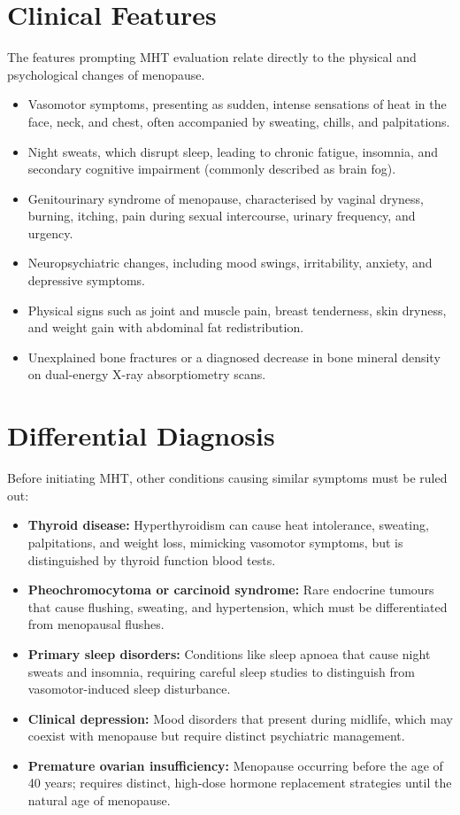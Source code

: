\section*{Clinical Features}
The features prompting MHT evaluation relate directly to the physical and psychological changes of menopause.
\begin{itemize}
    \item Vasomotor symptoms, presenting as sudden, intense sensations of heat in the face, neck, and chest, often accompanied by sweating, chills, and palpitations.
    \item Night sweats, which disrupt sleep, leading to chronic fatigue, insomnia, and secondary cognitive impairment (commonly described as brain fog).
    \item Genitourinary syndrome of menopause, characterised by vaginal dryness, burning, itching, pain during sexual intercourse, urinary frequency, and urgency.
    \item Neuropsychiatric changes, including mood swings, irritability, anxiety, and depressive symptoms.
    \item Physical signs such as joint and muscle pain, breast tenderness, skin dryness, and weight gain with abdominal fat redistribution.
    \item Unexplained bone fractures or a diagnosed decrease in bone mineral density on dual-energy X-ray absorptiometry scans.
\end{itemize}

\section*{Differential Diagnosis}
Before initiating MHT, other conditions causing similar symptoms must be ruled out:
\begin{itemize}
    \item \textbf{Thyroid disease:} Hyperthyroidism can cause heat intolerance, sweating, palpitations, and weight loss, mimicking vasomotor symptoms, but is distinguished by thyroid function blood tests.
    \item \textbf{Pheochromocytoma or carcinoid syndrome:} Rare endocrine tumours that cause flushing, sweating, and hypertension, which must be differentiated from menopausal flushes.
    \item \textbf{Primary sleep disorders:} Conditions like sleep apnoea that cause night sweats and insomnia, requiring careful sleep studies to distinguish from vasomotor-induced sleep disturbance.
    \item \textbf{Clinical depression:} Mood disorders that present during midlife, which may coexist with menopause but require distinct psychiatric management.
    \item \textbf{Premature ovarian insufficiency:} Menopause occurring before the age of 40 years; requires distinct, high-dose hormone replacement strategies until the natural age of menopause.
\end{itemize}

